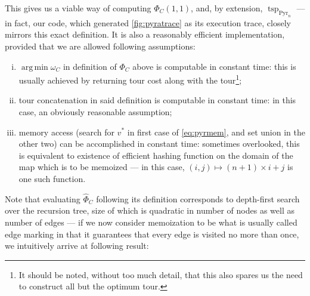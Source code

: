 \documentclass[index=totoc,bibliography=totoc]{scrartcl}
\DeclareMathOperator*{\argmin}{arg\,min}
\numberwithin{equation}{section}
\numberwithin{figure}{section}
\numberwithin{table}{section}
\begin{document}
\begin{remark}
\label{rem:timeass}
This gives us a viable way of computing $\Phi_C\left(1,1\right)$, and, by extension,
$\operatorname{tsp}_{\operatorname{Pyr}_n}$ --- in fact, our code, which
generated \cref{fig:pyratrace} as its execution trace, closely mirrors this exact
definition.
It is also a reasonably efficient implementation, provided that we are
allowed following assumptions:
  \begin{enumerate}[(i)]
    \item
      $\argmin \omega_C$ in definition of $\Phi_C$ above is computable in constant time:
      this is usually achieved by returning tour cost along with the
      tour\footnote{%
        It should be noted, without too much detail, that this also spares
        us the need to construct all but the optimum tour.
      };
    \item
      tour concatenation in said definition is computable in constant time:
      in this case, an obviously reasonable assumption;
    \item
      memory access (search for $v^\ast$ in first case of \eqref{eq:pyrmem},
      and set union in the other two) can be accomplished in constant time:
      sometimes overlooked, this is equivalent to existence of efficient hashing
      function on the domain of the map which is to be memoized ---
      in this case, $(i,j) \mapsto (n+1)\times i + j$ is one such function.
  \end{enumerate}
\end{remark}

Note that evaluating $\widehat{\Phi}_C$ following its definition corresponds to
depth-first search over the recursion tree, size of which is quadratic in number of nodes
as well as number of edges --- if we now consider memoization to be what
is usually called edge marking in that it guarantees that every edge
is visited no more than once, we intuitively arrive at following result:
\end{document}
